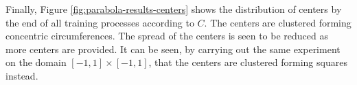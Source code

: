 \documentclass[12pt]{report} %
\begin{document}


Finally,
Figure \ref{fig:parabola-results-centers} shows the distribution of centers by the end of all training processes according to $C$. The centers are clustered forming concentric circumferences. The spread of the centers is seen to be reduced as more centers are provided. It can be seen, by carrying out the same experiment on the domain $[-1,1]\times[-1,1]$, that the centers are clustered forming squares instead.
\end{document}

